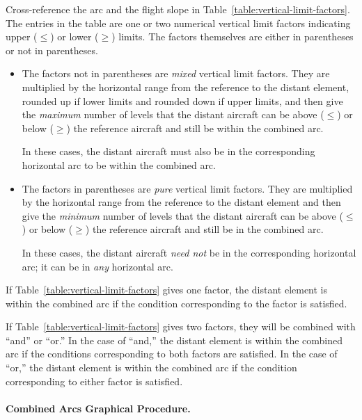 {Cross-reference the arc and the flight slope in Table~\ref{table:vertical-limit-factors}. The entries in the table are one or two numerical vertical limit factors indicating upper ($\le$) or lower ($\ge$) limits. The factors themselves are either in parentheses or not in parentheses.

\begin{itemize}

\item
The factors not in parentheses are \emph{mixed} vertical limit factors. They are multiplied by the horizontal range from the reference to the distant element, rounded up if lower limits and rounded down if upper limits, and then give the \emph{maximum} number of levels that the distant aircraft can be above ($\le$) or below ($\ge$) the reference aircraft and still be within the combined arc. 

In these cases, the distant aircraft must also be in the corresponding horizontal arc to be within the combined arc.

\item
The factors in parentheses are \emph{pure} vertical limit factors. They are multiplied by the horizontal range from the reference to the distant element and then give the \emph{minimum} number of levels that the distant aircraft can be above ($\le$) or below ($\ge$) the reference aircraft and still be in the combined arc. 

In these cases, the distant aircraft \emph{need not} be in the corresponding horizontal arc; it can be in \emph{any} horizontal arc.

\end{itemize}

If Table~\ref{table:vertical-limit-factors} gives one factor, the distant element is within the combined arc if the condition corresponding to the factor is satisfied.

If Table~\ref{table:vertical-limit-factors} gives two factors, they will be combined with “and” or “or.” In the case of “and,” the distant element is within the combined arc if the conditions corresponding to both factors are satisfied. In the case of “or,” the distant element is within the combined arc if the condition corresponding to either factor is satisfied.


\paragraph{Combined Arcs Graphical Procedure.}

}
